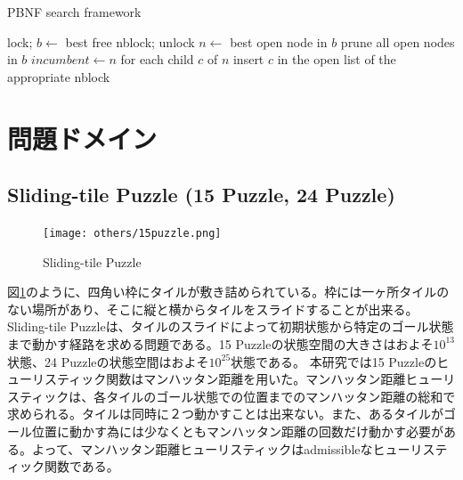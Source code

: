 \documentclass{jsarticle}
\renewcommand{\textbf}{} %
\begin{document}
\begin{algorithm}                      
\caption{PBNF search framework}         
\label{alg:pbnf}                          
\begin{algorithmic}                  
	\STATE lock; $b \leftarrow$ best free nblock; unlock
		\STATE $n \leftarrow$ best open node in $b$
			\STATE prune all open nodes in $b$
			\STATE $incumbent \leftarrow n$
		\ELSE 
			\STATE for each child $c$ of $n$
			\STATE insert $c$ in the open list of the appropriate nblock
		\ENDIF
\ENDWHILE
\ENDWHILE
\end{algorithmic}
\end{algorithm}



\section{問題ドメイン}
\label{sec:domain}

\subsection{Sliding-tile Puzzle (15 Puzzle, 24 Puzzle)}

\begin{figure}
	\centering
	\texttt{[image: others/15puzzle.png]}
	\caption{Sliding-tile Puzzle}
	\label{fig:15puzzle}
\end{figure}%
図\ref{fig:15puzzle}のように、四角い枠にタイルが敷き詰められている。枠には一ヶ所タイルのない場所があり、そこに縦と横からタイルをスライドすることが出来る。\textbf{Sliding-tile Puzzle}は、タイルのスライドによって初期状態から特定のゴール状態まで動かす経路を求める問題である。15 Puzzleの状態空間の大きさはおよそ$10^{13}$状態、24 Puzzleの状態空間はおよそ$10^{25}$状態である。 本研究では15 Puzzleのヒューリスティック関数は\textbf{マンハッタン距離}を用いた。マンハッタン距離ヒューリスティックは、各タイルのゴール状態での位置までのマンハッタン距離の総和で求められる。タイルは同時に２つ動かすことは出来ない。また、あるタイルがゴール位置に動かす為には少なくともマンハッタン距離の回数だけ動かす必要がある。よって、マンハッタン距離ヒューリスティックはadmissibleなヒューリスティック関数である。
\newline
\end{document}

